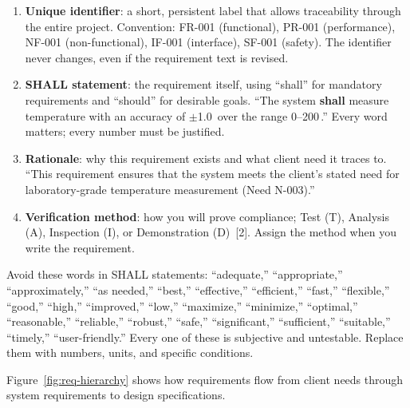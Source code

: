 \begin{enumerate}[nosep,leftmargin=1.5em]
\item \textbf{Unique identifier}: a short, persistent label that allows traceability through the entire project. Convention: FR-001 (functional), PR-001 (performance), NF-001 (non-functional), IF-001 (interface), SF-001 (safety). The identifier never changes, even if the requirement text is revised.
\item \textbf{SHALL statement}: the requirement itself, using ``shall'' for mandatory requirements and ``should'' for desirable goals. ``The system \textbf{shall} measure temperature with an accuracy of $\pm$1.0\,\degC{} over the range 0--200\,\degC{}.'' Every word matters; every number must be justified.
\item \textbf{Rationale}: why this requirement exists and what client need it traces to. ``This requirement ensures that the system meets the client's stated need for laboratory-grade temperature measurement (Need N-003).''
\item \textbf{Verification method}: how you will prove compliance; Test (T), Analysis (A), Inspection (I), or Demonstration (D)~[2]. Assign the method when you write the requirement.
\end{enumerate}

\begin{warningbox}
Avoid these words in SHALL statements: ``adequate,'' ``appropriate,'' ``approximately,'' ``as needed,'' ``best,'' ``effective,'' ``efficient,'' ``fast,'' ``flexible,'' ``good,'' ``high,'' ``improved,'' ``low,'' ``maximize,'' ``minimize,'' ``optimal,'' ``reasonable,'' ``reliable,'' ``robust,'' ``safe,'' ``significant,'' ``sufficient,'' ``suitable,'' ``timely,'' ``user-friendly.'' Every one of these is subjective and untestable. Replace them with numbers, units, and specific conditions.
\end{warningbox}

Figure~\ref{fig:req-hierarchy} shows how requirements flow from client needs through system requirements to design specifications.

